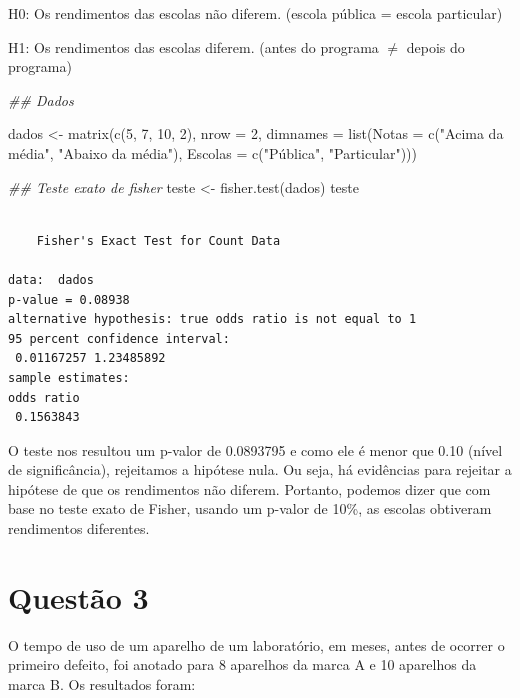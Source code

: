 \documentclass[
  letterpaper,
  DIV=11,
  numbers=noendperiod]{scrartcl}
\newenvironment{Shaded}{\begin{snugshade}}{\end{snugshade}}
\newcommand{\AttributeTok}[1]{\textcolor[rgb]{0.40,0.45,0.13}{#1}}
\newcommand{\DecValTok}[1]{\textcolor[rgb]{0.68,0.00,0.00}{#1}}
\newcommand{\DocumentationTok}[1]{\textcolor[rgb]{0.37,0.37,0.37}{\textit{#1}}}
\newcommand{\FunctionTok}[1]{\textcolor[rgb]{0.28,0.35,0.67}{#1}}
\newcommand{\NormalTok}[1]{\textcolor[rgb]{0.00,0.23,0.31}{#1}}
\newcommand{\OtherTok}[1]{\textcolor[rgb]{0.00,0.23,0.31}{#1}}
\newcommand{\StringTok}[1]{\textcolor[rgb]{0.13,0.47,0.30}{#1}}
\begin{document}
H0: Os rendimentos das escolas não diferem. (escola pública = escola
particular)

H1: Os rendimentos das escolas diferem. (antes do programa \(\neq\)
depois do programa)

\begin{Shaded}
\begin{Highlighting}[]
\DocumentationTok{\#\# Dados}

\NormalTok{dados  }\OtherTok{\textless{}{-}}
  \FunctionTok{matrix}\NormalTok{(}\FunctionTok{c}\NormalTok{(}\DecValTok{5}\NormalTok{, }\DecValTok{7}\NormalTok{, }\DecValTok{10}\NormalTok{, }\DecValTok{2}\NormalTok{),}
         \AttributeTok{nrow =} \DecValTok{2}\NormalTok{,}
         \AttributeTok{dimnames =} \FunctionTok{list}\NormalTok{(}\AttributeTok{Notas =} \FunctionTok{c}\NormalTok{(}\StringTok{"Acima da média"}\NormalTok{, }\StringTok{"Abaixo da média"}\NormalTok{),}
                         \AttributeTok{Escolas =} \FunctionTok{c}\NormalTok{(}\StringTok{"Pública"}\NormalTok{, }\StringTok{"Particular"}\NormalTok{)))}

\DocumentationTok{\#\# Teste exato de fisher}
\NormalTok{teste }\OtherTok{\textless{}{-}} \FunctionTok{fisher.test}\NormalTok{(dados)}
\NormalTok{teste}
\end{Highlighting}
\end{Shaded}

\begin{verbatim}

    Fisher's Exact Test for Count Data

data:  dados
p-value = 0.08938
alternative hypothesis: true odds ratio is not equal to 1
95 percent confidence interval:
 0.01167257 1.23485892
sample estimates:
odds ratio 
 0.1563843 
\end{verbatim}

O teste nos resultou um p-valor de 0.0893795 e como ele é menor que 0.10
(nível de significância), rejeitamos a hipótese nula. Ou seja, há
evidências para rejeitar a hipótese de que os rendimentos não diferem.
Portanto, podemos dizer que com base no teste exato de Fisher, usando um
p-valor de 10\%, as escolas obtiveram rendimentos diferentes.

\section{Questão 3}\label{questuxe3o-3}

O tempo de uso de um aparelho de um laboratório, em meses, antes de
ocorrer o primeiro defeito, foi anotado para 8 aparelhos da marca A e 10
aparelhos da marca B. Os resultados foram:
\end{document}
